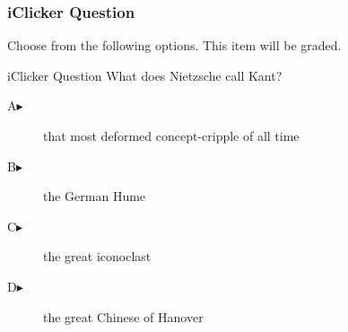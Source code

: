 \begin{frame}
  \frametitle{iClicker Question}
Choose from the following options. This item will be graded.
\begin{block}{iClicker Question}
What does Nietzsche call Kant?
\end{block}
\begin{description}
\item[A\hspace{.2in}$\blacktriangleright$] that most deformed concept-cripple of all time
\item[B\hspace{.2in}$\blacktriangleright$] the German Hume
\item[C\hspace{.2in}$\blacktriangleright$] the great iconoclast
\item[D\hspace{.2in}$\blacktriangleright$] the great Chinese of Hanover
\end{description}
\end{frame}
